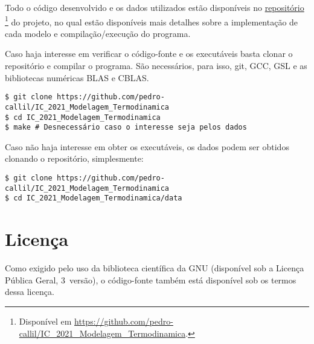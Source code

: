 Todo o código desenvolvido e os dados utilizados estão disponíveis no
\href{https://github.com/pedro-callil/IC_2021_Modelagem_Termodinamica}{repositório}
\footnote{Disponível em
	\url{https://github.com/pedro-callil/IC_2021_Modelagem_Termodinamica}.}
do projeto, no qual estão disponíveis mais detalhes sobre a implementação de
cada modelo e compilação/execução do programa.

Caso haja interesse em verificar o código-fonte e os executáveis basta clonar o
repositório e compilar o programa. São necessários, para isso, git, GCC, GSL e as
bibliotecas numéricas BLAS e CBLAS.

\begin{verbatim}
$ git clone https://github.com/pedro-callil/IC_2021_Modelagem_Termodinamica
$ cd IC_2021_Modelagem_Termodinamica
$ make # Desnecessário caso o interesse seja pelos dados
\end{verbatim}

Caso não haja interesse em obter os executáveis, os dados podem ser obtidos
clonando o repositório, simplesmente:

\begin{verbatim}
$ git clone https://github.com/pedro-callil/IC_2021_Modelagem_Termodinamica
$ cd IC_2021_Modelagem_Termodinamica/data
\end{verbatim}

\section{Licença}

Como exigido pelo uso da biblioteca científica da GNU (disponível sob a Licença
Pública Geral, 3\textordfeminine\ versão), o código-fonte também está disponível
sob os termos dessa licença.

